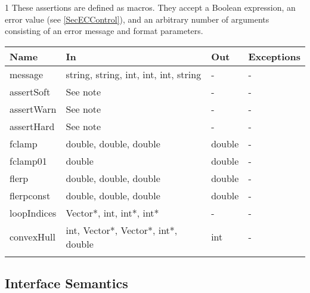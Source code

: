 \documentclass[12pt]{article}
\begin{document}
	\begin{ThreePartTable}
		\centering
		
		\begin{TableNotes}
			\footnotesize
			\item[1] These assertions are defined as macros. They accept a Boolean expression, an error value (see \ref{SecECControl}), and an arbitrary number of arguments consisting of an error message and format parameters.
		\end{TableNotes}
		
	\renewcommand*{\arraystretch}{1.2}
	\begin{longtable}{| y | x{3.5cm} | y | x{3.5cm} |}
			\hline \textbf{Name} & \textbf{In} & \textbf{Out} & \textbf{Exceptions} \\ \hline 
			message & string, string, int, int, int, string & - & - \\ \hline
			assertSoft & See note  & - & - \\ \hline
			assertWarn & See note  & - & - \\ \hline
			assertHard & See note  & - & - \\ \hline
			fclamp & double, double, double & double & - \\ \hline
			fclamp01 & double & double & - \\ \hline
			flerp & double, double, double & double & - \\ \hline
			flerpconst & double, double, double & double & - \\ \hline
			loopIndices & Vector*, int, int*, int* & - & - \\ \hline
			convexHull & int, Vector*, Vector*, int*, double & int & - \\ \hline
			\insertTableNotes
		\end{longtable}
	\end{ThreePartTable}

\subsection{Interface Semantics}

	
\end{document}
